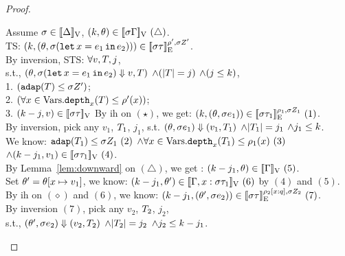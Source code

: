 \documentclass[a4paper,11pt]{article}
\theoremstyle{definition}
\begin{document}
\begin{proof}
\begin{mainitem}
%
Assume $ \sigma \in [\![ \Delta ]\!]_{\text{V}}$, $(k, \theta) \in [\![ \sigma \Gamma ]\!]_{\text{V}} ~ (\triangle)$.\\
%
TS: $(k, (\theta, \sigma (\mathop{\mathtt{let}} x = e_1 \mathop{ \mathtt{in}} e_2) )) 
	\in [\![ \sigma \tau ]\!]_{\text{E}}^{\rho', \sigma Z'}$.\\
%
By inversion, STS: 
%
$\forall v, T, j$, \\
s.t.,
%
$(\theta, \sigma (\mathop{\mathtt{let}} x = e_1 \mathop{ \mathtt{in}} e_2) \mathrel{\Downarrow} v, T)$
%
$\land (|T| = j)$
%
$\land (j \leq k) $, \\
% 
1. $ (\mathtt{adap}(T) \leq \sigma Z')$;\\
%
2. $(\forall x \in \mbox{Vars}. \mathtt{depth}_{x}(T) \leq \rho'(x))$;\\
%
3. $(k - j, v) \in [\![ \sigma \tau ]\!]_{\text{V}} $
%
By ih on $(\star)$, 
%
we get: $(k, (\theta, \sigma e_1  )) \in [\![ \sigma \tau_1 ]\!]_{\text{E}}^{\rho_1, \sigma Z_1}~(1)$.\\
%
By inversion, pick any $v_1$, $T_1$, $j_1$,
%
s.t. $(\theta, \sigma e_1) \mathrel{\Downarrow} (v_1, T_1)$ 
%
$\land |T_1| = j_1$
%
$\land j_1 \leq k$.\\
%
We know:
%
$ \mathtt{adap}(T_1) \leq \sigma Z_1 ~ (2)$
%
$\land \forall x \in \mbox{Vars}. \mathtt{depth}_{x}(T_1) \leq \rho_1(x) ~ (3)$
%
$\land (k - j_1, v_1) \in [\![ \sigma \tau_1 ]\!]_{\text{V}} ~ (4)$.\\
%
By Lemma~\ref{lem:downward} on $(\triangle)$,
%
we get : $(k-j_1, \theta) \in [\![ \Gamma ]\!]_{\text{V}}~(5)$. \\
%
Set $\theta' = \theta[x \mapsto v_1]$,
%
we know:
%
 $(k-j_1, \theta') \in [\![ \Gamma,x: \sigma \tau_1 ]\!]_{\text{V}} ~(6) $
by $(4)$ and $(5)$.
%
By ih on $(\diamond)$ and $(6)$, 
%
we know:
%
$(k-j_1, (\theta', \sigma e_2  )) \in [\![ \sigma \tau ]\!]_{\text{E}}^{\rho_2[x:q], \sigma Z_2} ~(7) $.\\
%
By inversion $(7)$, pick any $v_2$, $T_2$, $j_2$,\\
%
s.t., $(\theta', \sigma e_2) \mathrel{\Downarrow} (v_2, T_2)$ 
%
$\land |T_2| = j_2$
%
$\land j_2 \leq k - j_1$.\\

\end{mainitem}
\end{proof}
\end{document}
